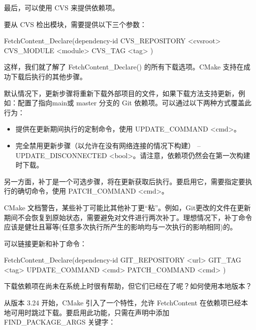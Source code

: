 最后，可以使用 CVS 来提供依赖项。


要从 CVS 检出模块，需要提供以下三个参数：

\begin{shell}
FetchContent_Declare(dependency-id
                     CVS_REPOSITORY <cvsroot>
                     CVS_MODULE <module>
                     CVS_TAG <tag>
)
\end{shell}

这样，我们就了解了 FetchContent\_Declare() 的所有下载选项。CMake 支持在成功下载后执行的其他步骤。


默认情况下，更新步骤将重新下载外部项目的文件，如果下载方法支持更新，例如：配置了指向main或 master 分支的 Git 依赖项。可以通过以下两种方式覆盖此行为：

\begin{itemize}
\item
提供在更新期间执行的定制命令，使用 UPDATE\_COMMAND <cmd>。

\item
完全禁用更新步骤（以允许在没有网络连接的情况下构建） – UPDATE\_DISCONNECTED <bool>。请注意，依赖项仍然会在第一次构建时下载。
\end{itemize}

另一方面，补丁是一个可选步骤，将在更新获取后执行。要启用它，需要指定要执行的确切命令，使用 PATCH\_COMMAND <cmd>。

CMake 文档警告，某些补丁可能比其他补丁更“粘”。例如，Git更改的文件在更新期间不会恢复到原始状态，需要避免对文件进行两次补丁。理想情况下，补丁命令应该是健壮且幂等(任意多次执行所产生的影响均与一次执行的影响相同)的。

可以链接更新和补丁命令：

\begin{shell}
FetchContent_Declare(dependency-id
                     GIT_REPOSITORY <url>
                     GIT_TAG <tag>
                     UPDATE_COMMAND <cmd>
                     PATCH_COMMAND <cmd>
)
\end{shell}

下载依赖项在尚未在系统上时很有帮助，但它们已经在了呢？如何使用本地版本？


从版本 3.24 开始，CMake 引入了一个特性，允许 FetchContent 在依赖项已经本地可用时跳过下载。要启用此功能，只需在声明中添加 FIND\_PACKAGE\_ARGS 关键字：

